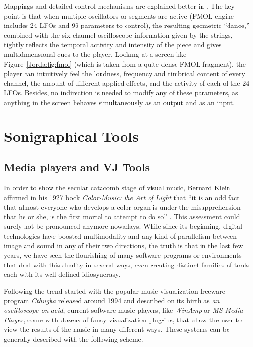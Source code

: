 Mappings and detailed control mechanisms are explained better in \cite{Jorda:2002}. The key
point  is that when multiple  oscillators or segments are active (FMOL engine
includes 24 LFOs and 96 parameters to control), the resulting geometric
``dance,'' combined  with  the   six-channel  oscilloscope information given by
the strings, tightly reflects the temporal activity  and intensity of the piece
and gives multidimensional  cues to the player. Looking at a screen like Figure~\ref{Jorda:fig:fmol}
(which is taken from a quite dense FMOL fragment), the player can intuitively
feel the loudness, frequency  and  timbrical  content  of every channel, the
amount of different applied effects, and the activity of each of the 24 LFOs.
Besides, no indirection is  needed  to  modify any of these parameters, as
anything in the screen behaves simultaneously as an output and as an input.

\section{Sonigraphical Tools}

\subsection{Media players and VJ Tools}

In order to show the secular catacomb stage of visual  music, Bernard Klein
affirmed in his 1927 book  \textit{Color-Music:  the Art of Light} that ``it is an odd
fact that almost everyone who develops a color-organ is under the misapprehension
that  he or she, is the first mortal to attempt to do so'' \cite{Klein:1927}. This assessment
could surely not be pronounced anymore nowadays.  While  since  its  beginning, 
digital  technologies have boosted multimodality and any kind of parallelism
between image and sound in any of  their  two directions,  the truth is that in
the last few years, we have seen the flourishing of many software programs or
environments that deal with this duality in several ways, even creating
distinct families of tools each with its well defined idiosyncrasy.

Following the trend started with the popular music visualization freeware
program \textit{Cthugha} released around 1994 and described  on  its  birth  as \textit{an 
oscilloscope  on  acid}, current software  music  players,  like  \textit{WinAmp} or 
\textit{MS Media Player}, come with dozens of fancy visualization  plug-ins,  that allow  the  user  to  view  the  results  of  the  music  in  many different ways. These
systems can be generally described with the following scheme.

